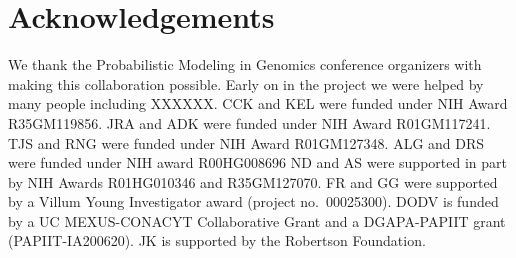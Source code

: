 \documentclass[12pt,halfline,a4paper]{ouparticle}
\begin{document}

\section*{Acknowledgements}
We thank the Probabilistic Modeling in Genomics conference organizers with making this collaboration possible.
Early on in the project we were helped by many people including XXXXXX.
CCK and KEL were funded under NIH Award R35GM119856.
JRA and ADK were funded under NIH Award R01GM117241.
TJS and RNG were funded under NIH Award R01GM127348.
ALG and DRS were funded under NIH award R00HG008696
ND and AS were supported in part by NIH Awards R01HG010346 and R35GM127070.
FR and GG were supported by a Villum Young Investigator award (project no.~00025300).
DODV is funded by a UC MEXUS-CONACYT Collaborative Grant and a DGAPA-PAPIIT grant (PAPIIT-IA200620).
JK is supported by the Robertson Foundation.
\end{document}

